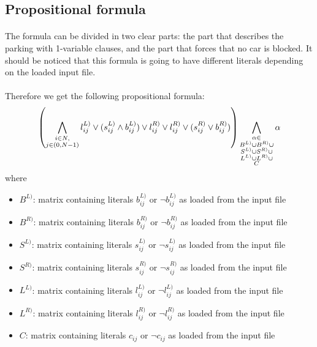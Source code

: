 \subsection{Propositional formula}

\paragraph{}
The formula can be divided in two clear parts: the part that describes the parking with 1-variable clauses, and the part that forces that no car is blocked. It should be noticed that this formula is going to have different literals depending on the loaded input file.

\paragraph{}
Therefore we get the following propositional formula:
\begin{equation}
  \left(
  \bigwedge_{\substack{i \in N,\\ j \in (0, N-1)}}l^{L)}_{ij} \lor (s^{L)}_{ij} \land b^{L)}_{ij}) \lor l^{R)}_{ij} \lor l^{R)}_{ij} \lor (s^{R)}_{ij} \lor b^{R)}_{ij}) \right)
  \bigwedge_{\substack{
      \alpha \in\\
      B^{L)} \cup
      B^{R)} \cup \\
      S^{L)} \cup
      S^{R)} \cup \\
      L^{L)} \cup
      L^{R)} \cup \\
      C
    }}
    \alpha
\end{equation}
where
\begin{itemize}
  \item $B^{L)}$: matrix containing literals $b^{L)}_{ij}$ or $\neg b^{L)}_{ij}$ as loaded from the input file
  \item $B^{R)}$: matrix containing literals $b^{R)}_{ij}$ or $\neg b^{R)}_{ij}$ as loaded from the input file
  \item $S^{L)}$: matrix containing literals $s^{L)}_{ij}$ or $\neg s^{L)}_{ij}$ as loaded from the input file
  \item $S^{R)}$: matrix containing literals $s^{R)}_{ij}$ or $\neg s^{R)}_{ij}$ as loaded from the input file
  \item $L^{L)}$: matrix containing literals $l^{L)}_{ij}$ or $\neg l^{L)}_{ij}$ as loaded from the input file
  \item $L^{R)}$: matrix containing literals $l^{R)}_{ij}$ or $\neg l^{R)}_{ij}$ as loaded from the input file
  \item $C$: matrix containing literals $c_{ij}$ or $\neg c_{ij}$ as loaded from the input file
\end{itemize}

